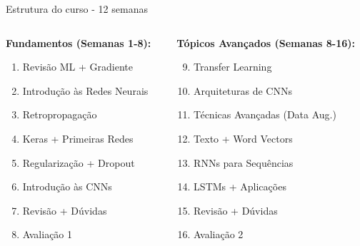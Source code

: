 \documentclass[xcolor=dvipsnames,t,aspectratio=169]{beamer} %
\begin{document}
\begin{frame}[c]{Estrutura do curso - 12 semanas}
    \begin{columns}[c]
        \begin{column}{0.5\textwidth}
            \textbf{Fundamentos (Semanas 1-8):}
            \begin{enumerate}
                \item Revisão ML + Gradiente
                \item Introdução às Redes Neurais
                \item Retropropagação
                \item Keras + Primeiras Redes
                \item Regularização + Dropout
                \item Introdução às CNNs
                \item Revisão + Dúvidas
                \item Avaliação 1
            \end{enumerate}
        \end{column}
        \begin{column}{0.5\textwidth}
            \textbf{Tópicos Avançados (Semanas 8-16):}
            \begin{enumerate}
                \setcounter{enumi}{8}
                \item Transfer Learning
                \item Arquiteturas de CNNs
                \item Técnicas Avançadas (Data Aug.)
                \item Texto + Word Vectors
                \item RNNs para Sequências
                \item LSTMs + Aplicações
                \item Revisão + Dúvidas
                \item Avaliação 2
            \end{enumerate}
        \end{column}
    \end{columns}
\end{frame}
\end{document}
